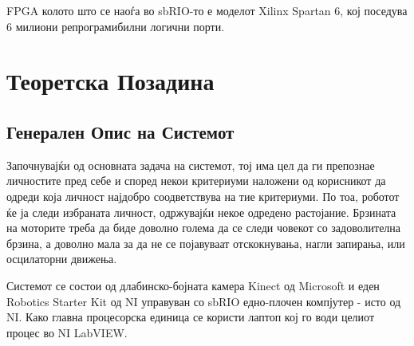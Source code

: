\documentclass[12pt]{article}
\begin{document}
		FPGA колото што се наоѓа во sbRIO-то е моделот Xilinx Spartan 6, кој поседува 6 милиони репрограмибилни логични порти.

\newpage

\section{Теоретска Позадина}

  \subsection{Генерален Опис на Системот}
    \label{sec:general_desc}
    Започнувајќи од основната задача на системот, тој има цел да ги препознае личностите пред себе и според некои критериуми наложени од корисникот да одреди која личност најдобро соодветствува на тие критериуми. По тоа, роботот ќе ја следи избраната личност, одржувајќи некое одредено растојание. Брзината на моторите треба да биде доволно голема да се следи човекот со задоволителна брзина, а доволно мала за да не се појавуваат отскокнувања, нагли запирања, или осцилаторни движења.

    Системот се состои од длабинско-бојната камера Kinect од Microsoft и еден Robotics Starter Kit од NI управуван со sbRIO едно-плочен компјутер - исто од NI. Како главна процесорска единица се користи лаптоп кој го води целиот процес во NI LabVIEW.
\end{document}
